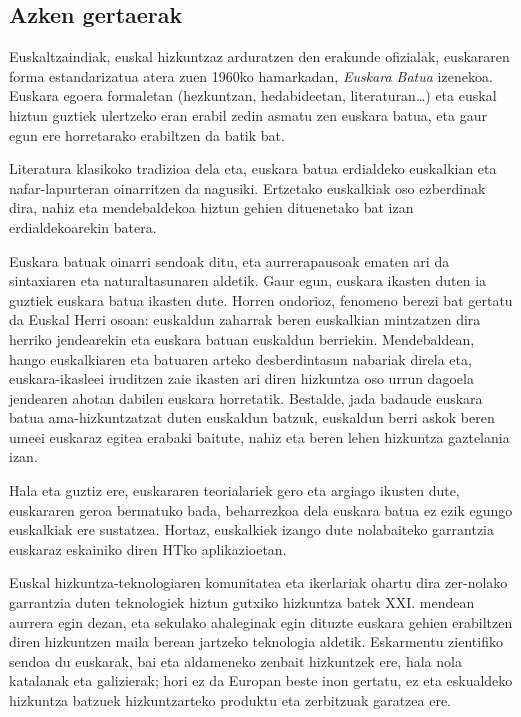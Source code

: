 \begin{multicols}{2}
\subsection{Azken gertaerak}
    Euskaltzaindiak, euskal hizkuntzaz arduratzen den erakunde ofizialak, euskararen forma estandarizatua atera zuen 1960ko hamarkadan, \textit{Euskara Batua} izenekoa. Euskara egoera formaletan (hezkuntzan, hedabideetan, literaturan…) eta euskal hiztun guztiek ulertzeko eran erabil zedin asmatu zen euskara batua, eta gaur egun ere horretarako erabiltzen da batik bat. 

Literatura klasikoko tradizioa dela eta, euskara batua erdialdeko euskalkian eta nafar-lapurteran oinarritzen da nagusiki. Ertzetako euskalkiak oso ezberdinak dira, nahiz eta mendebaldekoa hiztun gehien dituenetako bat izan erdialdekoarekin batera.

Euskara batuak oinarri sendoak ditu, eta aurrerapausoak ematen ari da sintaxiaren eta naturaltasunaren aldetik. Gaur egun, euskara ikasten duten ia guztiek euskara batua ikasten dute. Horren ondorioz, fenomeno berezi bat gertatu da Euskal Herri osoan: euskaldun zaharrak beren euskalkian mintzatzen dira herriko jendearekin eta euskara batuan euskaldun berriekin. Mendebaldean, hango euskalkiaren eta batuaren arteko desberdintasun nabariak direla eta, euskara-ikasleei iruditzen zaie ikasten ari diren hizkuntza oso urrun dagoela jendearen ahotan dabilen euskara horretatik. Bestalde, jada badaude euskara batua ama-hizkuntzatzat duten euskaldun batzuk, euskaldun berri askok beren umeei euskaraz egitea erabaki baitute, nahiz eta beren lehen hizkuntza gaztelania izan. 

Hala eta guztiz ere, euskararen teorialariek \cite{BAS-Nota9}  gero eta argiago ikusten dute, euskararen geroa bermatuko bada, beharrezkoa dela euskara batua ez ezik egungo euskalkiak ere sustatzea. Hortaz, euskalkiek izango dute nolabaiteko garrantzia euskaraz eskainiko diren HTko aplikazioetan.

Euskal hizkuntza-teknologiaren komunitatea eta ikerlariak ohartu dira zer-nolako garrantzia duten teknologiek hiztun gutxiko hizkuntza batek XXI. mendean aurrera egin dezan, eta sekulako ahaleginak egin dituzte euskara gehien erabiltzen diren hizkuntzen maila berean jartzeko teknologia aldetik. Eskarmentu zientifiko sendoa du euskarak, bai eta aldameneko zenbait hizkuntzek ere, hala nola katalanak eta galizierak; hori ez da Europan beste inon gertatu, ez eta eskualdeko hizkuntza batzuek hizkuntzarteko produktu eta zerbitzuak garatzea ere.


\end{multicols}
